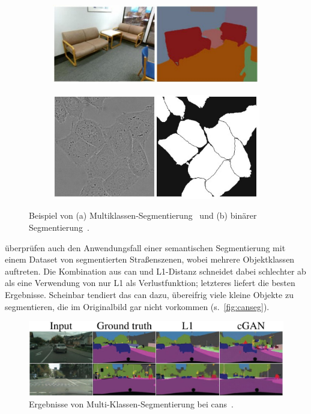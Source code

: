 \begin{figure}
	\centering
	\begin{subfigure}{.45\textwidth}
		\centering
		\includegraphics[width=0.9\linewidth]{img/segnet_multiclassseg}
		\caption{}
		\label{fig:segnet_multiclassseg}
	\end{subfigure}
	\begin{subfigure}{.45\textwidth}
		\centering
		\includegraphics[width=0.9\linewidth]{img/unet_binaryseg}
		\caption{}
		\label{fig:unet_binaryseg}
	\end{subfigure}
	\caption{Beispiel von (a) Multiklassen-Segmentierung~\cite{Badrinarayanan.2017} und (b) binärer Segmentierung~\cite{Ronneberger.2015}.}
\end{figure}

\citeauthor{Isola.2017} überprüfen auch den Anwendungsfall einer semantischen Segmentierung mit einem Dataset von segmentierten Straßenszenen, wobei mehrere Objektklassen auftreten.
Die Kombination aus \gls{can} und L1-Distanz schneidet dabei schlechter ab als eine Verwendung von nur L1 als Verlustfunktion; letzteres liefert die besten Ergebnisse.
Scheinbar tendiert das \gls{can} dazu, übereifrig viele kleine Objekte zu segmentieren, die im Originalbild gar nicht vorkommen (s.~\autoref{fig:canseg}).

\begin{figure}
	\centering
	\includegraphics[width=0.9\linewidth]{img/can_seg}
	\caption{Ergebnisse von Multi-Klassen-Segmentierung bei \glspl{can}~\cite{Isola.2017}.}
	\label{fig:canseg}
\end{figure}

